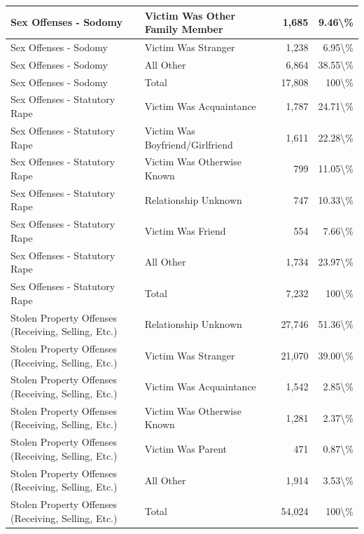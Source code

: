 \documentclass[
]{krantz}
\begin{document}
\begin{longtable}[t]{l|l|r|r}
\hline
Sex Offenses - Sodomy & Victim Was Other Family Member & 1,685 & 9.46\textbackslash{}\%\\
\hline
Sex Offenses - Sodomy & Victim Was Stranger & 1,238 & 6.95\textbackslash{}\%\\
\hline
Sex Offenses - Sodomy & All Other & 6,864 & 38.55\textbackslash{}\%\\
\hline
Sex Offenses - Sodomy & Total & 17,808 & 100\textbackslash{}\%\\
\hline
Sex Offenses - Statutory Rape & Victim Was Acquaintance & 1,787 & 24.71\textbackslash{}\%\\
\hline
Sex Offenses - Statutory Rape & Victim Was Boyfriend/Girlfriend & 1,611 & 22.28\textbackslash{}\%\\
\hline
Sex Offenses - Statutory Rape & Victim Was Otherwise Known & 799 & 11.05\textbackslash{}\%\\
\hline
Sex Offenses - Statutory Rape & Relationship Unknown & 747 & 10.33\textbackslash{}\%\\
\hline
Sex Offenses - Statutory Rape & Victim Was Friend & 554 & 7.66\textbackslash{}\%\\
\hline
Sex Offenses - Statutory Rape & All Other & 1,734 & 23.97\textbackslash{}\%\\
\hline
Sex Offenses - Statutory Rape & Total & 7,232 & 100\textbackslash{}\%\\
\hline
Stolen Property Offenses (Receiving, Selling, Etc.) & Relationship Unknown & 27,746 & 51.36\textbackslash{}\%\\
\hline
Stolen Property Offenses (Receiving, Selling, Etc.) & Victim Was Stranger & 21,070 & 39.00\textbackslash{}\%\\
\hline
Stolen Property Offenses (Receiving, Selling, Etc.) & Victim Was Acquaintance & 1,542 & 2.85\textbackslash{}\%\\
\hline
Stolen Property Offenses (Receiving, Selling, Etc.) & Victim Was Otherwise Known & 1,281 & 2.37\textbackslash{}\%\\
\hline
Stolen Property Offenses (Receiving, Selling, Etc.) & Victim Was Parent & 471 & 0.87\textbackslash{}\%\\
\hline
Stolen Property Offenses (Receiving, Selling, Etc.) & All Other & 1,914 & 3.53\textbackslash{}\%\\
\hline
Stolen Property Offenses (Receiving, Selling, Etc.) & Total & 54,024 & 100\textbackslash{}\%\\
\hline
\end{longtable}
\end{document}
